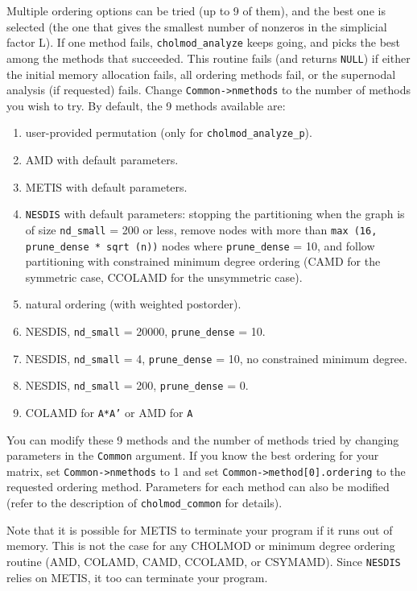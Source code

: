 \documentclass[11pt]{article}
\begin{document}
Multiple ordering options can be tried (up to 9 of them), and the best one
is selected (the one that gives the smallest number of nonzeros in the
simplicial factor L).  If one method fails, {\tt cholmod\_analyze} keeps going, and
picks the best among the methods that succeeded.  This routine fails (and
returns {\tt NULL}) if either the initial memory allocation fails, all ordering methods
fail, or the supernodal analysis (if requested) fails.  Change {\tt Common->nmethods} to the
number of methods you wish to try.  By default, the 9 methods available are:

\begin{enumerate}
\item user-provided permutation (only for {\tt cholmod\_analyze\_p}).
\item AMD with default parameters.
\item METIS with default parameters.
\item {\tt NESDIS} with default parameters: stopping the partitioning when
	    the graph is of size {\tt nd\_small} = 200 or less, remove nodes with
	    more than {\tt max (16, prune\_dense * sqrt (n))} nodes where
	    {\tt prune\_dense} = 10, and follow partitioning with
	    constrained minimum degree ordering
	    (CAMD for the symmetric case,
	    CCOLAMD for the unsymmetric case).
\item natural ordering (with weighted postorder).
\item NESDIS, {\tt nd\_small} = 20000, {\tt prune\_dense} = 10.
\item NESDIS, {\tt nd\_small} =     4, {\tt prune\_dense} = 10,
    no constrained minimum degree.
\item NESDIS, {\tt nd\_small} =   200, {\tt prune\_dense} = 0.
\item COLAMD for {\tt A*A'} or AMD for {\tt A}
\end{enumerate}

You can modify these 9 methods and the number of methods tried by changing
parameters in the {\tt Common} argument.  If you know the best ordering for your
matrix, set {\tt Common->nmethods} to 1 and set {\tt Common->method[0].ordering} to the
requested ordering method.  Parameters for each method can also be modified
(refer to the description of {\tt cholmod\_common} for details).

Note that it is possible for METIS to terminate your program if it runs out
of memory.  This is not the case for any CHOLMOD or minimum degree ordering
routine (AMD, COLAMD, CAMD, CCOLAMD, or CSYMAMD).
Since {\tt NESDIS} relies on METIS, it too can terminate your program.
\end{document}
